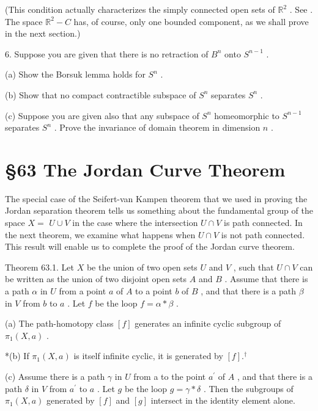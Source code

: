 (This condition actually characterizes the simply connected open sets of \({\mathbb{R}}^{2}\) . See \cite{Rudin1987}. The space \({\mathbb{R}}^{2} - C\) has, of course, only one bounded component, as we shall prove in the next section.)

6. Suppose you are given that there is no retraction of \({B}^{n}\) onto \({S}^{n - 1}\) .

(a) Show the Borsuk lemma holds for \({S}^{n}\) .

(b) Show that no compact contractible subspace of \({S}^{n}\) separates \({S}^{n}\) .

(c) Suppose you are given also that any subspace of \({S}^{n}\) homeomorphic to \({S}^{n - 1}\) separates \({S}^{n}\) . Prove the invariance of domain theorem in dimension \(n\) .

\section*{ \S 63 The Jordan Curve Theorem}

The special case of the Seifert-van Kampen theorem that we used in proving the Jordan separation theorem tells us something about the fundamental group of the space \(X =\)  \(U \cup  V\) in the case where the intersection \(U \cap  V\) is path connected. In the next theorem, we examine what happens when \(U \cap  V\) is not path connected. This result will enable us to complete the proof of the Jordan curve theorem.

Theorem 63.1. Let \(X\) be the union of two open sets \(U\) and \(V\) , such that \(U \cap  V\) can be written as the union of two disjoint open sets \(A\) and \(B\) . Assume that there is a path \(\alpha\) in \(U\) from a point \(a\) of \(A\) to a point \(b\) of \(B\) , and that there is a path \(\beta\) in \(V\) from \(b\) to \(a\) . Let \(f\) be the loop \(f = \alpha  * \beta\) .

(a) The path-homotopy class \(\left\lbrack  f\right\rbrack\) generates an infinite cyclic subgroup of \({\pi }_{1}\left( {X,a}\right)\) .

*(b) If \({\pi }_{1}\left( {X,a}\right)\) is itself infinite cyclic, it is generated by \(\left\lbrack  f\right\rbrack  {.}^{ \dagger  }\)

(c) Assume there is a path \(\gamma\) in \(U\) from a to the point \({a}^{\prime }\) of \(A\) , and that there is a path \(\delta\) in \(V\) from \({a}^{\prime }\) to \(a\) . Let \(g\) be the loop \(g = \gamma  * \delta\) . Then the subgroups of \({\pi }_{1}\left( {X,a}\right)\) generated by \(\left\lbrack  f\right\rbrack\) and \(\left\lbrack  g\right\rbrack\) intersect in the identity element alone.

